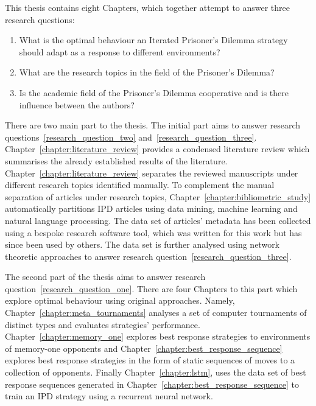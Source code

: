 This thesis contains eight Chapters, which together attempt to answer three research
questions:

\begin{enumerate}
    \item What is the optimal behaviour an Iterated Prisoner's Dilemma strategy should adapt as a response to different
 environments?\label{research_question_one}
    \item What are the research topics in the field of the Prisoner's Dilemma?\label{research_question_two}
    \item Is the academic field of the Prisoner's Dilemma cooperative and is there
    influence between the authors?\label{research_question_three}
\end{enumerate}

There are two main part to the thesis. The initial part aims to answer research
questions~\ref{research_question_two} and~\ref{research_question_three}.
Chapter~\ref{chapter:literature_review} provides a condensed
literature review which summarises the already established results of the
literature. Chapter~\ref{chapter:literature_review} separates the reviewed manuscripts
under different research topics identified manually. To complement the manual
separation of articles under research topics,
Chapter~\ref{chapter:bibliometric_study} automatically partitions \totalarticles IPD
articles using data mining, machine learning and  natural language processing. The data set of \totalarticles articles' metadata has
been collected using a bespoke research software tool, which was written for this work but has since been used by others. The data set is further
analysed using network theoretic approaches to answer research question~\ref{research_question_three}.

The second part of the thesis aims to answer research
question~\ref{research_question_one}. There are four Chapters to this part which
explore optimal behaviour using original approaches. Namely,
Chapter~\ref{chapter:meta_tournaments} analyses a set of \numberofalltournaments computer
tournaments of distinct types and evaluates \numberofstrategies strategies'
performance. Chapter~\ref{chapter:memory_one} explores best response strategies
to environments of memory-one opponents and
Chapter~\ref{chapter:best_response_sequence} explores best response strategies
in the form of static sequences of moves to a collection of opponents. Finally
Chapter~\ref{chapter:lstm}, uses the data set of best response sequences
generated in Chapter~\ref{chapter:best_response_sequence} to train an IPD
strategy using a recurrent neural network.

